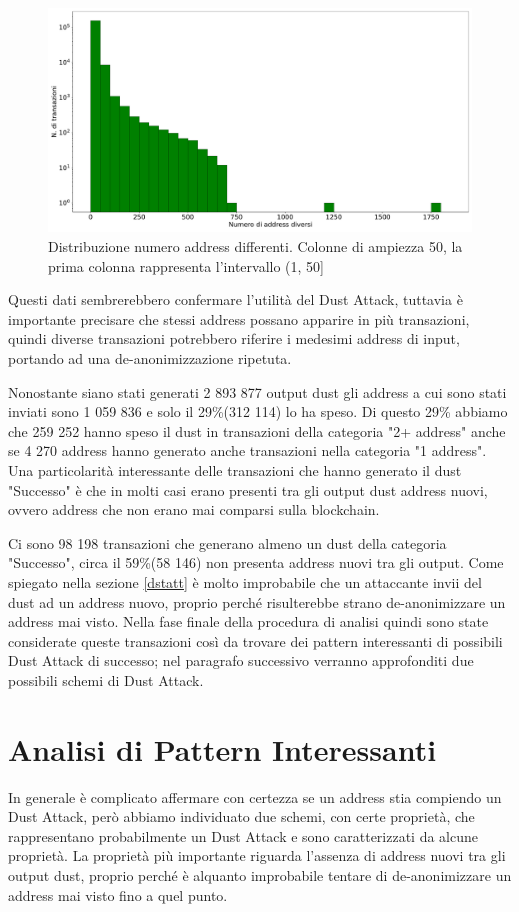 \begin{figure}[h!]
     \centering
     \includegraphics[scale=0.3]{Grafici/num_addr.pdf}
     \caption{Distribuzione numero address differenti. Colonne di ampiezza 50, la prima colonna rappresenta l'intervallo (1, 50]}
     \label{fig:diff_addr}
 \end{figure}
\FloatBarrier
Questi dati sembrerebbero confermare l'utilità del Dust Attack, tuttavia è importante precisare che stessi address possano apparire in più transazioni, quindi diverse transazioni potrebbero riferire i medesimi address di input, portando ad una de-anonimizzazione ripetuta. 

Nonostante siano stati generati 2 893 877 output dust gli address a cui sono stati inviati sono 1 059 836 e solo il 29\%(312 114) lo ha speso. Di questo 29\% abbiamo che 259 252 hanno speso il dust in transazioni della categoria "2+ address" anche se 4 270 address hanno generato anche transazioni nella categoria "1 address". Una particolarità interessante delle transazioni che hanno generato il dust "Successo" è che in molti casi erano presenti tra gli output dust address nuovi, ovvero address che non erano mai comparsi sulla blockchain. 

Ci sono 98 198 transazioni che generano almeno un dust della categoria "Successo", circa il 59\%(58 146) non presenta address nuovi tra gli output. Come spiegato nella sezione \ref{dstatt} è molto improbabile che un attaccante invii del dust ad un address nuovo, proprio perché risulterebbe strano de-anonimizzare un address mai visto. Nella fase finale della procedura di analisi quindi sono state considerate queste transazioni così da trovare dei pattern interessanti di possibili Dust Attack di successo; nel paragrafo successivo verranno approfonditi due possibili schemi di Dust Attack.  
\section{Analisi di Pattern Interessanti}\label{pattern}
In generale è complicato affermare con certezza se un address stia compiendo un Dust Attack, però abbiamo individuato due schemi, con certe proprietà, che rappresentano probabilmente un Dust Attack e sono caratterizzati da alcune proprietà. La proprietà più importante riguarda l'assenza di address nuovi tra gli output dust, proprio perché è alquanto improbabile tentare di de-anonimizzare un address mai visto fino a quel punto.

